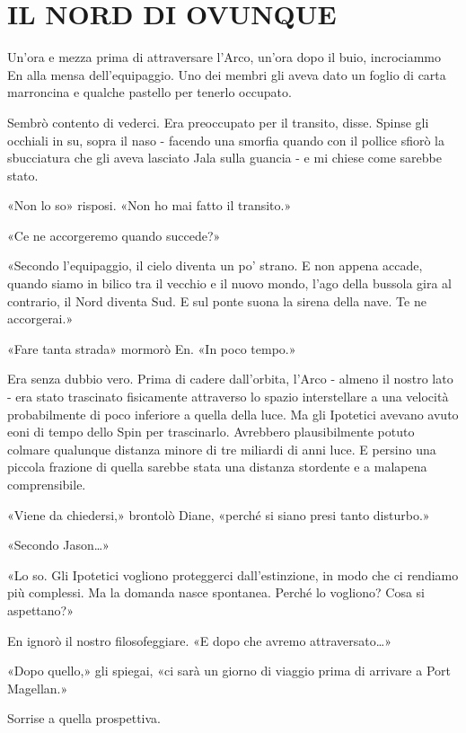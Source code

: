 \chapter{IL NORD DI OVUNQUE}\label{il-nord-di-ovunque}

\hfill\break

Un'ora e mezza prima di attraversare l'Arco, un'ora dopo il buio,
incrociammo En alla mensa dell'equipaggio. Uno dei membri gli aveva dato
un foglio di carta marroncina e qualche pastello per tenerlo occupato.

Sembrò contento di vederci. Era preoccupato per il transito, disse.
Spinse gli occhiali in su, sopra il naso - facendo una smorfia quando
con il pollice sfiorò la sbucciatura che gli aveva lasciato Jala sulla
guancia - e mi chiese come sarebbe stato.

«Non lo so» risposi. «Non ho mai fatto il transito.»

«Ce ne accorgeremo quando succede?»

«Secondo l'equipaggio, il cielo diventa un po' strano. E non appena
accade, quando siamo in bilico tra il vecchio e il nuovo mondo, l'ago
della bussola gira al contrario, il Nord diventa Sud. E sul ponte suona
la sirena della nave. Te ne accorgerai.»

«Fare tanta strada» mormorò En. «In poco tempo.»

Era senza dubbio vero. Prima di cadere dall'orbita, l'Arco - almeno il
nostro lato - era stato trascinato fisicamente attraverso lo spazio
interstellare a una velocità probabilmente di poco inferiore a quella
della luce. Ma gli Ipotetici avevano avuto eoni di tempo dello Spin per
trascinarlo. Avrebbero plausibilmente potuto colmare qualunque distanza
minore di tre miliardi di anni luce. E persino una piccola frazione di
quella sarebbe stata una distanza stordente e a malapena comprensibile.

«Viene da chiedersi,» brontolò Diane, «perché si siano presi tanto
disturbo.»

«Secondo Jason\ldots»

«Lo so. Gli Ipotetici vogliono proteggerci dall'estinzione, in modo che
ci rendiamo più complessi. Ma la domanda nasce spontanea. Perché lo
vogliono? Cosa si aspettano?»

En ignorò il nostro filosofeggiare. «E dopo che avremo
attraversato\ldots»

«Dopo quello,» gli spiegai, «ci sarà un giorno di viaggio prima di
arrivare a Port Magellan.»

Sorrise a quella prospettiva.

